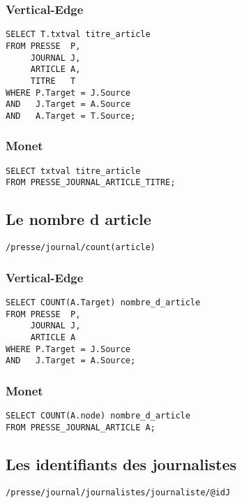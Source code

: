 \subsubsection{Vertical-Edge}
\begin{verbatim}
SELECT T.txtval titre_article
FROM PRESSE  P,
     JOURNAL J,
     ARTICLE A,
     TITRE   T
WHERE P.Target = J.Source
AND   J.Target = A.Source
AND   A.Target = T.Source;
\end{verbatim}

\subsubsection{Monet}
\begin{verbatim}
SELECT txtval titre_article
FROM PRESSE_JOURNAL_ARTICLE_TITRE;
\end{verbatim}

\subsection {Le nombre d article}
\begin{verbatim}
/presse/journal/count(article)
\end{verbatim}
\subsubsection{Vertical-Edge}
\begin{verbatim}
SELECT COUNT(A.Target) nombre_d_article
FROM PRESSE  P,
     JOURNAL J,
     ARTICLE A
WHERE P.Target = J.Source
AND   J.Target = A.Source;
\end{verbatim}

\subsubsection{Monet}
\begin{verbatim}
SELECT COUNT(A.node) nombre_d_article
FROM PRESSE_JOURNAL_ARTICLE A;
\end{verbatim}

\subsection {Les identifiants des journalistes}
\begin{verbatim}
/presse/journal/journalistes/journaliste/@idJ
\end{verbatim}
